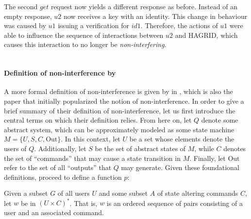 The second \(get\) request now yields a different response as before. Instead of an empty response, \(u2\) now receives a key with an identity. This change in behaviour was caused by \(u1\) issuing a verification for \(id1\). Therefore, the actions of \(u1\) were able to influence the sequence of interactions between \(u2\) and HAGRID, which causes this interaction to no longer be \emph{non-interfering}.
\\ \\

\paragraph{Definition of non-interference by \citeauthor{Goguen_Meseguer_82}}
A more formal definition of non-interference is given by \citeauthor{Goguen_Meseguer_82} in , which is also the paper that initially popularized the notion of non-interference. 
In order to give a brief summary of their definition of non-interference, let us first introduce the central terms on which their definition relies. From here on, let \(Q\) denote some abstract system, which can be approximately modeled as some state machine \(M = \{U,S,C,\text{Out}\}\). 
In this context, let \(U\) be a set whose elements denote the users of \(Q\). Additionally, let \(S\) be the set of abstract states of \(M\), while \(C\) denotes the set of ``commands'' that may cause a state transition in \(M\). Finally, let \(\text{Out}\) refer to the set of all ``outputs'' that \(Q\) may generate. 
Given these foundational definitions, \citeauthor{Goguen_Meseguer_82} proceed to define a function \(p\): 

Given a subset \(G\) of all users \(U\) and some subset \(A\) of state altering commands \(C\), let \(w\) be in \((U \times C)^*\). That is, \(w\) is an ordered sequence of pairs consisting of a user and an associated command. 

